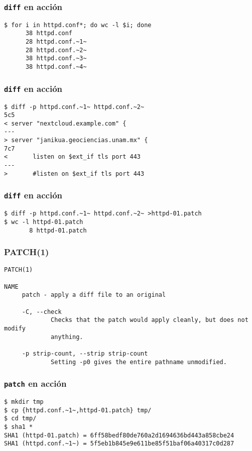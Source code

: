 \documentclass{beamer}
\begin{document}
\begin{frame}[fragile]
  \frametitle{\texttt{diff} en acci\'on}
\begin{verbatim}
$ for i in httpd.conf*; do wc -l $i; done
      38 httpd.conf
      28 httpd.conf.~1~
      28 httpd.conf.~2~
      38 httpd.conf.~3~
      38 httpd.conf.~4~
\end{verbatim}
\end{frame}

\begin{frame}[fragile]
  \frametitle{\texttt{diff} en acci\'on}
\begin{verbatim}
$ diff -p httpd.conf.~1~ httpd.conf.~2~
5c5
< server "nextcloud.example.com" {
---
> server "janikua.geociencias.unam.mx" {
7c7
<       listen on $ext_if tls port 443
---
>       #listen on $ext_if tls port 443
\end{verbatim}
\end{frame}

\begin{frame}[fragile]
  \frametitle{\texttt{diff} en acci\'on}
\begin{verbatim}
$ diff -p httpd.conf.~1~ httpd.conf.~2~ >httpd-01.patch
$ wc -l httpd-01.patch
       8 httpd-01.patch
\end{verbatim}
\end{frame}


\begin{frame}[fragile]
  \frametitle{PATCH(1)}
\begin{verbatim}
PATCH(1)

NAME
     patch - apply a diff file to an original

     -C, --check
             Checks that the patch would apply cleanly, but does not modify
             anything.

     -p strip-count, --strip strip-count
             Setting -p0 gives the entire pathname unmodified. 
\end{verbatim}  
\end{frame}

\begin{frame}[fragile]
  \frametitle{\texttt{patch} en acci\'on}
\begin{verbatim}
$ mkdir tmp
$ cp {httpd.conf.~1~,httpd-01.patch} tmp/
$ cd tmp/
$ sha1 *
SHA1 (httpd-01.patch) = 6ff58bedf80de760a2d1694636bd443a858cbe24
SHA1 (httpd.conf.~1~) = 5f5eb1b845e9e611be85f51baf06a40317c0d287
\end{verbatim}
\end{frame}
\end{document}
